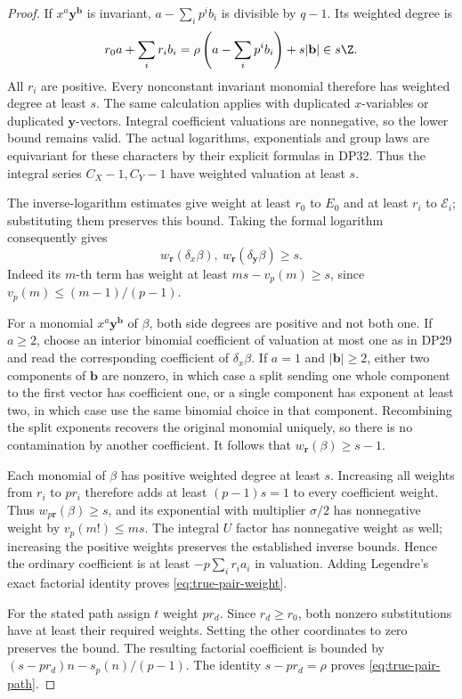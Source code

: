\begin{proof}
If $x^a\mathbf y^{\mathbf b}$ is invariant, $a-\sum_i p^ib_i$ is divisible by $q-1$. Its weighted degree is
\[
 r_0a+\sum_i r_ib_i
 =\rho\left(a-\sum_i p^ib_i\right)+s|\mathbf b|\in s\Z.
\]
All $r_i$ are positive. Every nonconstant invariant monomial therefore has weighted degree at least $s$. The same calculation applies with duplicated $x$-variables or duplicated $\mathbf y$-vectors. Integral coefficient valuations are nonnegative, so the lower bound remains valid. The actual logarithms, exponentials and group laws are equivariant for these characters by their explicit formulas in DP32. Thus the integral series $C_X-1,C_Y-1$ have weighted valuation at least $s$.

The inverse-logarithm estimates give weight at least $r_0$ to $E_0$ and at least $r_i$ to $\mathcal E_i$; substituting them preserves this bound. Taking the formal logarithm consequently gives
\[
 w_{\mathbf r}(\delta_x\beta),\ w_{\mathbf r}(\delta_{\mathbf y}\beta)\ge s.
\]
Indeed its $m$-th term has weight at least $ms-v_p(m)\ge s$, since $v_p(m)\le(m-1)/(p-1)$.

For a monomial $x^a\mathbf y^{\mathbf b}$ of $\beta$, both side degrees are positive and not both one. If $a\ge2$, choose an interior binomial coefficient of valuation at most one as in DP29 and read the corresponding coefficient of $\delta_x\beta$. If $a=1$ and $|\mathbf b|\ge2$, either two components of $\mathbf b$ are nonzero, in which case a split sending one whole component to the first vector has coefficient one, or a single component has exponent at least two, in which case use the same binomial choice in that component. Recombining the split exponents recovers the original monomial uniquely, so there is no contamination by another coefficient. It follows that $w_{\mathbf r}(\beta)\ge s-1$.

Each monomial of $\beta$ has positive weighted degree at least $s$. Increasing all weights from $r_i$ to $pr_i$ therefore adds at least $(p-1)s=1$ to every coefficient weight. Thus $w_{p\mathbf r}(\beta)\ge s$, and its exponential with multiplier $\sigma/2$ has nonnegative weight by $v_p(m!)\le ms$. The integral $U$ factor has nonnegative weight as well; increasing the positive weights preserves the established inverse bounds. Hence the ordinary coefficient is at least $-p\sum_i r_ia_i$ in valuation. Adding Legendre's exact factorial identity proves \eqref{eq:true-pair-weight}.

For the stated path assign $t$ weight $pr_d$. Since $r_d\ge r_0$, both nonzero substitutions have at least their required weights. Setting the other coordinates to zero preserves the bound. The resulting factorial coefficient is bounded by $(s-pr_d)n-s_p(n)/(p-1)$. The identity $s-pr_d=\rho$ proves \eqref{eq:true-pair-path}.
\end{proof}
